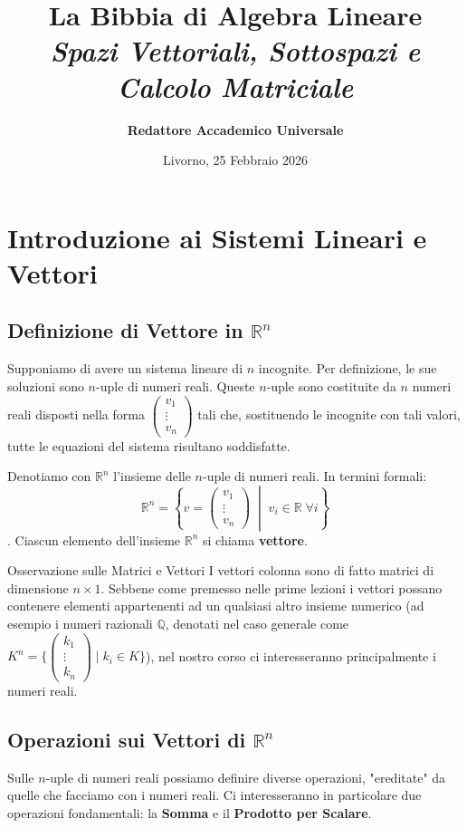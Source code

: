\documentclass[11pt,a4paper]{article}
\title{\Huge \textbf{La Bibbia di Algebra Lineare} \\ \Large \textit{Spazi Vettoriali, Sottospazi e Calcolo Matriciale}}
\author{\textbf{Redattore Accademico Universale}}
\date{Livorno, 25 Febbraio 2026}
\begin{document}
\maketitle
\tableofcontents
\newpage

\section{Introduzione ai Sistemi Lineari e Vettori}

\subsection{Definizione di Vettore in $\mathbb{R}^n$}
Supponiamo di avere un sistema lineare di $n$ incognite. Per definizione, le sue soluzioni sono $n$-uple di numeri reali. Queste $n$-uple sono costituite da $n$ numeri reali disposti nella forma $\begin{pmatrix} v_1 \\ \vdots \\ v_n \end{pmatrix}$ tali che, sostituendo le incognite con tali valori, tutte le equazioni del sistema risultano soddisfatte.

Denotiamo con $\mathbb{R}^n$ l'insieme delle $n$-uple di numeri reali. In termini formali:
$$ \mathbb{R}^n = \left\{ v = \begin{pmatrix} v_1 \\ \vdots \\ v_n \end{pmatrix} \;\middle|\; v_i \in \mathbb{R} \;\forall i \right\} $$.
Ciascun elemento dell'insieme $\mathbb{R}^n$ si chiama \textbf{vettore}.

\begin{concept}{Osservazione sulle Matrici e Vettori}{}
I vettori colonna sono di fatto matrici di dimensione $n \times 1$. Sebbene come premesso nelle prime lezioni i vettori possano contenere elementi appartenenti ad un qualsiasi altro insieme numerico (ad esempio i numeri razionali $\mathbb{Q}$, denotati nel caso generale come $K^n = \{ \begin{pmatrix} k_1 \\ \vdots \\ k_n \end{pmatrix} \mid k_i \in K \} $), nel nostro corso ci interesseranno principalmente i numeri reali.
\end{concept}

\subsection{Operazioni sui Vettori di $\mathbb{R}^n$}
Sulle $n$-uple di numeri reali possiamo definire diverse operazioni, "ereditate" da quelle che facciamo con i numeri reali. Ci interesseranno in particolare due operazioni fondamentali: la \textbf{Somma} e il \textbf{Prodotto per Scalare}.
\end{document}

